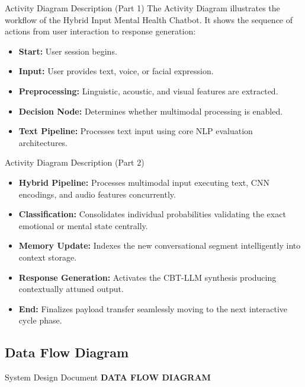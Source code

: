 \documentclass{beamer}
\begin{document}
\begin{frame}{Activity Diagram Description (Part 1)}
The Activity Diagram illustrates the workflow of the Hybrid Input Mental Health Chatbot. It shows the sequence of actions from user interaction to response generation:

\begin{itemize}
    \item \textbf{Start:} User session begins.
    \item \textbf{Input:} User provides text, voice, or facial expression.
    \item \textbf{Preprocessing:} Linguistic, acoustic, and visual features are extracted.
    \item \textbf{Decision Node:} Determines whether multimodal processing is enabled.
    \item \textbf{Text Pipeline:} Processes text input using core NLP evaluation architectures.
\end{itemize}
\end{frame}

\begin{frame}{Activity Diagram Description (Part 2)}
\begin{itemize}
    \item \textbf{Hybrid Pipeline:} Processes multimodal input executing text, CNN encodings, and audio features concurrently.
    \item \textbf{Classification:} Consolidates individual probabilities validating the exact emotional or mental state centrally.
    \item \textbf{Memory Update:} Indexes the new conversational segment intelligently into context storage.
    \item \textbf{Response Generation:} Activates the CBT-LLM synthesis producing contextually attuned output.
    \item \textbf{End:} Finalizes payload transfer seamlessly moving to the next interactive cycle phase.
\end{itemize}
\end{frame}


\subsection{Data Flow Diagram}
\begin{frame}{System Design Document}
    \justifying
    \centering
    \huge \textbf{DATA FLOW DIAGRAM}
\end{frame}
\end{document}
